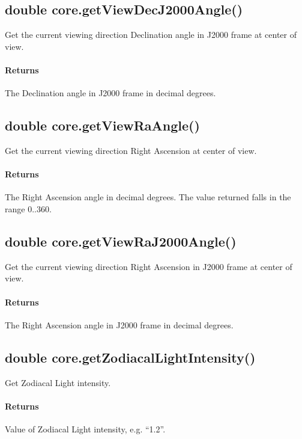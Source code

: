 \subsection{double core.getViewDecJ2000Angle()}
\label{sec:ScriptingAPI:core:getViewDecJ2000Angle}
Get the current viewing direction Declination angle in J2000 frame at center of view.

\paragraph{Returns}
The Declination angle in J2000 frame in decimal degrees.

\subsection{double core.getViewRaAngle()}
\label{sec:ScriptingAPI:core:getViewRaAngle}
Get the current viewing direction Right Ascension at center of view.

\paragraph{Returns}
The Right Ascension angle in decimal degrees. The value returned falls in the range 0..360.

\subsection{double core.getViewRaJ2000Angle()}
\label{sec:ScriptingAPI:core:getViewRaJ2000Angle}
Get the current viewing direction Right Ascension in J2000 frame at center of view.

\paragraph{Returns}
The Right Ascension angle in J2000 frame in decimal degrees.

\subsection{double core.getZodiacalLightIntensity()}
\label{sec:ScriptingAPI:core:getZodiacalLightIntensity}
Get Zodiacal Light intensity.

\paragraph{Returns}
Value of Zodiacal Light intensity, e.g. ``1.2''.

